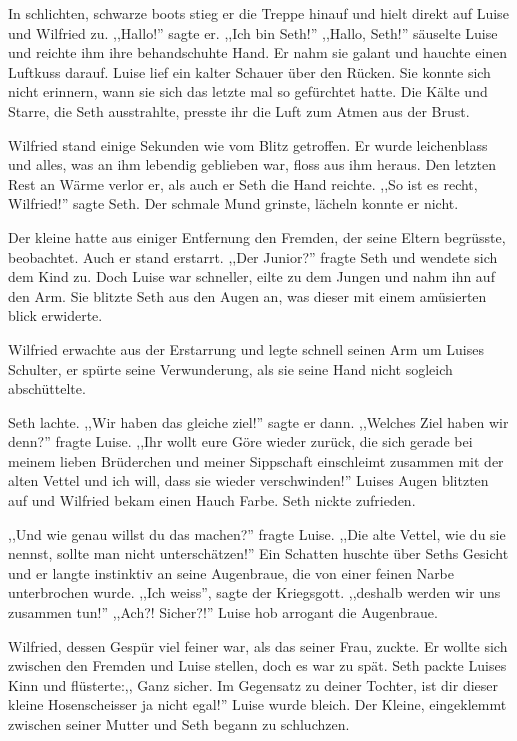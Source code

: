 In schlichten, schwarze boots stieg er die Treppe hinauf und hielt direkt auf Luise und Wilfried zu. ,,Hallo!'' sagte er. ,,Ich bin Seth!'' ,,Hallo, Seth!'' säuselte Luise und reichte ihm ihre behandschuhte Hand. Er nahm sie galant und hauchte einen Luftkuss darauf. Luise lief ein kalter Schauer über den Rücken. Sie konnte sich nicht erinnern, wann sie sich das letzte mal so gefürchtet hatte. Die Kälte und Starre, die Seth ausstrahlte, presste ihr die Luft zum Atmen aus der Brust.

Wilfried stand einige Sekunden wie vom Blitz getroffen. Er wurde leichenblass und alles, was an ihm lebendig geblieben war, floss aus ihm heraus. Den letzten Rest an Wärme verlor er, als auch er Seth die Hand reichte. ,,So ist es recht, Wilfried!'' sagte Seth. Der schmale Mund grinste, lächeln konnte er nicht.

Der kleine hatte aus einiger Entfernung den Fremden, der seine Eltern begrüsste, beobachtet. Auch er stand erstarrt. ,,Der Junior?'' fragte Seth und wendete sich dem Kind zu. Doch Luise war schneller, eilte zu dem Jungen und nahm ihn auf den Arm. Sie blitzte Seth aus den Augen an, was dieser mit einem amüsierten blick erwiderte.

Wilfried erwachte aus der Erstarrung und legte schnell seinen Arm um Luises Schulter, er spürte seine Verwunderung, als sie seine Hand nicht sogleich abschüttelte.

Seth lachte. ,,Wir haben das gleiche ziel!'' sagte er dann. ,,Welches Ziel haben wir denn?'' fragte Luise. ,,Ihr wollt eure Göre wieder zurück, die sich gerade bei meinem lieben Brüderchen und meiner Sippschaft einschleimt zusammen mit der alten Vettel und ich will, dass sie wieder verschwinden!'' Luises Augen blitzten auf und Wilfried bekam einen Hauch Farbe. Seth nickte zufrieden.

,,Und wie genau willst du das machen?'' fragte Luise. ,,Die alte Vettel, wie du sie nennst, sollte man nicht unterschätzen!'' Ein Schatten huschte über Seths Gesicht und er langte instinktiv an seine Augenbraue, die von einer feinen Narbe unterbrochen wurde. ,,Ich weiss'', sagte der Kriegsgott. ,,deshalb werden wir uns zusammen tun!'' ,,Ach?! Sicher?!'' Luise hob arrogant die Augenbraue. 

Wilfried, dessen Gespür viel feiner war, als das seiner Frau, zuckte. Er wollte sich zwischen den Fremden und Luise stellen, doch es war zu spät. Seth packte Luises Kinn und flüsterte:,, Ganz sicher. Im Gegensatz zu deiner Tochter, ist dir dieser kleine Hosenscheisser ja nicht egal!'' Luise wurde bleich. Der Kleine, eingeklemmt zwischen seiner Mutter und Seth begann zu schluchzen.


